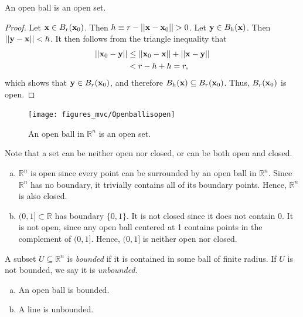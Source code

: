 \documentclass[12pt,letterpaper,reqno]{article}
\numberwithin{equation}{section}
\newcommand{\R}{\ensuremath{\mathbb R}}
\newcommand{\bx}{{\bf x}}
\newcommand{\by}{{\bf y}}
\begin{document}
{\newpage 

\begin{prop}\label{prop:open_ball_is_open}
An open ball is an open set.	
\end{prop}

\begin{proof}
	Let $\bx \in B_r(\bx_0)$. Then $h\equiv r-||\bx-\bx_0||>0$. Let $\by \in B_h(\bx)$. Then $||\by-\bx||<h$. It then follows from the triangle inequality that
	\begin{align*}
		||\bx_0-\by|| &\leq ||\bx_0-\bx||+||\bx-\by|| \\
		&<r-h+h=r,
	\end{align*}
	which shows that $\by \in B_r(\bx_0)$, and therefore $B_h(\bx) \subseteq B_r(\bx_0)$. Thus, $B_r(\bx_0)$ is open.
\end{proof}

\begin{figure}[h]
	\begin{center}
		\texttt{[image: figures\_mvc/Openballisopen]}
	\end{center}
	\caption{An open ball in $\R^n$ is an open set.}
\end{figure}

Note that a set can be neither open nor closed, or can be both open and closed.

\begin{example}
\begin{enumerate}[(a)]
	\item $\R^n$ is open since every point can be surrounded by an open ball in $\R^n$. Since $\R^n$ has no boundary, it trivially contains all of its boundary points. Hence, $\R^n$ is also closed.
	\item $(0,1] \subset \R$ has boundary $\{0,1\}$. It is not closed since it does not contain 0. It is not open, since any open ball centered at 1 contains points in the complement of $(0,1]$. Hence, $(0,1]$ is neither open nor closed.
\end{enumerate}	
\end{example}

\begin{defn}
	A subset $U \subseteq \R^n$ is \emph{bounded} if it is contained in some ball of finite radius. If $U$ is not bounded, we say it is \emph{unbounded}.
\end{defn}

\begin{example}
\begin{enumerate}[(a)]
	\item An open ball is bounded.
	\item A line is unbounded.
\end{enumerate}	
\end{example}

}
\end{document}
